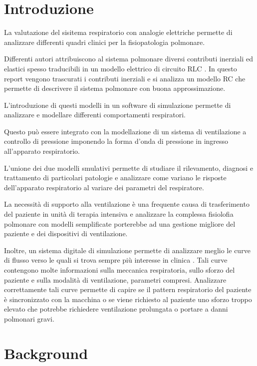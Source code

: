 \section{Introduzione}

La valutazione del sisitema respiratorio con analogie elettriche permette di analizzare differenti quadri clinici per la fisiopatologia polmonare. 

Differenti autori attribuiscono al sistema polmonare diversi contributi inerziali ed elastici spesso traducibili in un modello elettrico di circuito RLC \cite{ghafarian_review_nodate}. In questo report vengono trascurati i contributi inerziali e si analizza un modello RC che permette di descrivere il sistema polmonare con buona approssimazione. 

L'introduzione di questi modelli in un software di simulazione permette di analizzare e modellare differenti comportamenti respiratori. 

Questo può essere integrato con la modellazione di un sistema di ventilazione a controllo di pressione imponendo la forma d'onda di pressione in ingresso all'apparato respiratorio. 

L'unione dei due modelli smulativi permette di studiare il rilevamento, diagnosi e trattamento di particolari patologie e analizzare come variano le risposte dell'apparato respiratorio al variare dei parametri del respiratore.

La necessità di supporto alla ventilazione è una frequente causa di trasferimento del paziente in unità di terapia intensiva e analizzare la complessa fisiolofia polmonare con modelli semplificate porterebbe ad una gestione migliore del paziente e dei dispositivi di ventilazione.

Inoltre, un sistema digitale di simulazione permette di analizzare meglio le curve di flusso verso le quali si trova sempre più interesse in clinica \cite{hamahata_go_2020}. Tali curve contengono molte informazioni sulla meccanica respiratoria, sullo sforzo del paziente e sulla modalità di ventilazione, parametri compresi. Analizzare correttamente tali curve permette di capire se il pattern respiratorio del paziente è sincronizzato con la macchina o se viene richiesto al paziente uno sforzo troppo elevato che potrebbe richiedere ventilazione prolungata o portare a danni polmonari gravi.

\section{Background}

